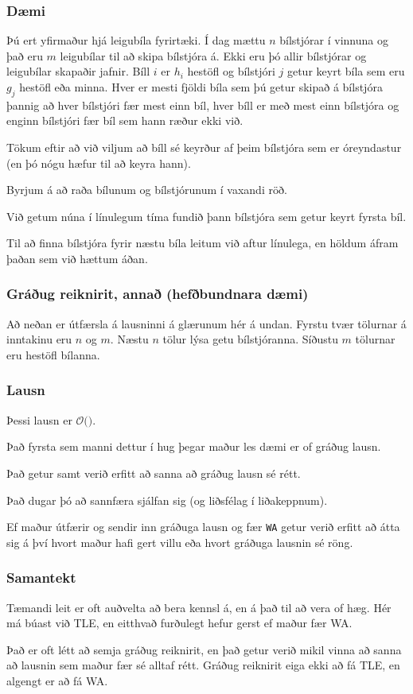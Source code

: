 {
	\frametitle{Dæmi}
	{
		\item<1-> 
			Þú ert yfirmaður hjá leigubíla fyrirtæki.
			Í dag mættu $n$ bílstjórar í vinnuna og það eru $m$ leigubílar til að skipa bílstjóra á.
			Ekki eru þó allir bílstjórar og leigubílar skapaðir jafnir.
			Bíll $i$ er $h_i$ hestöfl og bílstjóri $j$ getur keyrt bíla sem eru $g_j$ hestöfl eða minna.
			Hver er mesti fjöldi bíla sem þú getur skipað á bílstjóra
				þannig að hver bílstjóri fær mest einn bíl,
				hver bíll er með mest einn bílstjóra og
				enginn bílstjóri fær bíl sem hann ræður ekki við.
		\item<2-> Tökum eftir að við viljum að bíll sé keyrður af þeim bílstjóra sem er óreyndastur (en þó nógu hæfur til að keyra hann).
		\item<3-> Byrjum á að raða bílunum og bílstjórunum í vaxandi röð.
		\item<4-> Við getum núna í línulegum tíma fundið þann bílstjóra sem getur keyrt fyrsta bíl.
		\item<5-> Til að finna bílstjóra fyrir næstu bíla leitum við aftur línulega, en höldum áfram þaðan sem við hættum áðan.
	}
}

{
	\frametitle{Gráðug reiknirit, annað (hefðbundnara dæmi)}
	Að neðan er útfærsla á lausninni á glærunum hér á undan. Fyrstu tvær tölurnar á inntakinu eru $n$ og $m$. 
		Næstu $n$ tölur lýsa getu bílstjóranna.
		Síðustu $m$ tölurnar eru hestöfl bílanna.
}

{
	\frametitle{Lausn}
	{
		\item<1-> Þessi lausn er $\mathcal{O}($\onslide<2->{$n + m$}$)$.
	}
}

{
	{
		\item<1-> Það fyrsta sem manni dettur í hug þegar maður les dæmi er of gráðug lausn.
		\item<2-> Það getur samt verið erfitt að sanna að gráðug lausn sé rétt.
		\item<3-> Það dugar þó að sannfæra sjálfan sig (og liðsfélag í liðakeppnum).
		\item<4-> Ef maður útfærir og sendir inn gráðuga lausn og fær \texttt{WA}
					getur verið erfitt að átta sig á því hvort maður hafi gert villu eða hvort gráðuga lausnin sé röng.
	}
}

{
	\frametitle{Samantekt}
	{
		\item<1-> Tæmandi leit er oft auðvelta að bera kennsl á, en á það til að vera of hæg. 
			Hér má búast við TLE, en eitthvað furðulegt hefur gerst ef maður fær WA.
		\item<2-> Það er oft létt að semja gráðug reiknirit, en það getur verið mikil vinna að sanna að lausnin sem maður fær sé alltaf rétt.
			Gráðug reiknirit eiga ekki að fá TLE, en algengt er að fá WA.
	}
}

{
}


